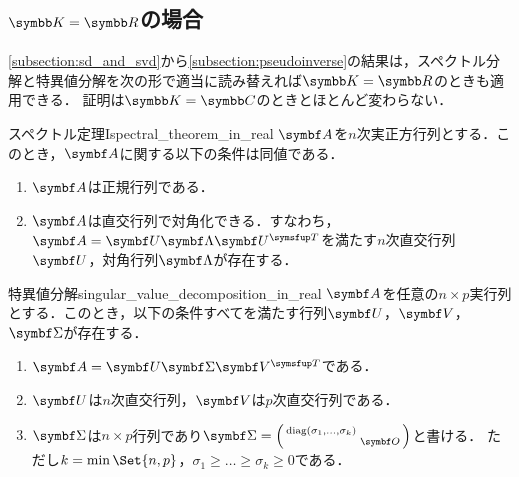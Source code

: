 \documentclass[../../main]{subfiles}
\begin{document}
\subsection{\texorpdfstring{\(\numset{K}=\numset{R}\)}{K=R}の場合}

\cref{subsection:sd_and_svd}から\cref{subsection:pseudoinverse}の結果は，スペクトル分解と特異値分解を次の形で適当に読み替えれば\(\numset{K}=\numset{R}\)のときも適用できる．
証明は\(\numset{K}=\numset{C}\)のときとほとんど変わらない．

\begin{theorem}{スペクトル定理I}{spectral_theorem_in_real}
  \(\mat{A}\)を\(n\)次実正方行列とする．このとき，\(\mat{A}\)に関する以下の条件は同値である．
  \begin{enumerate}
    \item \(\mat{A}\)は正規行列である．
    \item \(\mat{A}\)は直交行列\footnotemark で対角化できる．すなわち，\(\mat{A}=\mat{U}\mat{\Lambda}\trps{\mat{U}}\)を満たす\(n\)次直交行列\(\mat{U}\)，対角行列\(\mat{\Lambda}\)が存在する．
  \end{enumerate}
\end{theorem}

\begin{corollary}{特異値分解}{singular_value_decomposition_in_real}
  \(\mat{A}\)を任意の\(n\times p\)実行列とする．このとき，以下の条件すべてを満たす行列\(\mat{U}\)，\(\mat{V}\)，\(\mat{\Sigma}\)が存在する．
  \begin{enumerate}
    \item \(\mat{A}=\mat{U}\mat{\Sigma}\trps{\mat{V}}\)である．
    \item \(\mat{U}\)は\(n\)次直交行列，\(\mat{V}\)は\(p\)次直交行列である．
    \item \(\mat{\Sigma}\)は\(n\times p\)行列であり\(\mat{\Sigma}=\smallmatrice{\diag(\sigma_1,\dots,\sigma_k) & \\ & \zmat}\)と書ける．
      ただし\(k=\min\Set{n,p}\)，\(\sigma_1\geq\dots\geq\sigma_k\geq 0\)である．
  \end{enumerate}
\end{corollary}

\end{document}

